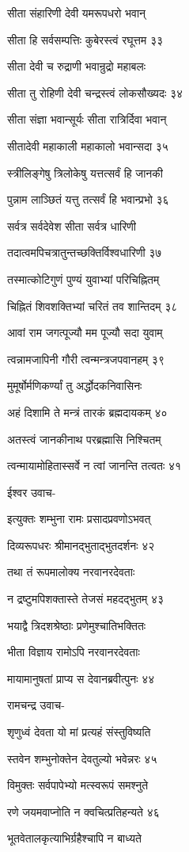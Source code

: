 सीता संहारिणी देवी यमरूपधरो भवान्

सीता हि सर्वसम्पत्तिः कुबेरस्त्वं रघूत्तम ३३

सीता देवी च रुद्राणी भवान्रुद्रो महाबलः

सीता तु रोहिणी देवी चन्द्रस्त्वं लोकसौख्यदः ३४

सीता संज्ञा भवान्सूर्यः सीता रात्रिर्दिवा भवान्

सीतादेवी महाकाली महाकालो भवान्सदा ३५

स्त्रीलिङ्गेषु त्रिलोकेषु यत्तत्सर्वं हि जानकी

पुन्नाम लाञ्छितं यत्तु तत्सर्वं हि भवान्प्रभो ३६

सर्वत्र सर्वदेवेश सीता सर्वत्र धारिणी

तदात्वमपिचत्रातुन्तच्छक्तिर्विश्वधारिणी ३७

तस्मात्कोटिगुणं पुण्यं युवाभ्यां परिचिह्नितम्

चिह्नितं शिवशक्तिभ्यां चरितं तव शान्तिदम् ३८

आवां राम जगत्पूज्यौ मम पूज्यौ सदा युवाम्

त्वन्नामजापिनी गौरी त्वन्मन्त्रजपवानहम् ३९

मुमूर्षोर्मणिकर्ण्यां तु अर्द्धोदकनिवासिनः

अहं दिशामि ते मन्त्रं तारकं ब्रह्मदायकम् ४०

अतस्त्वं जानकीनाथ परब्रह्मासि निश्चितम्

त्वन्मायामोहितास्सर्वे न त्वां जानन्ति तत्वतः ४१

ईश्वर उवाच-

इत्युक्तः शम्भुना रामः प्रसादप्रवणोऽभवत्

दिव्यरूपधरः श्रीमानद्भुताद्भुतदर्शनः ४२

तथा तं रूपमालोक्य नरवानरदेवताः

न द्रष्टुमपिशक्तास्ते तेजसं महदद्भुतम् ४३

भयाद्वै त्रिदशश्रेष्ठाः प्रणेमुश्चातिभक्तितः

भीता विज्ञाय रामोऽपि नरवानरदेवताः

मायामानुषतां प्राप्य स देवानब्रवीत्पुनः ४४

रामचन्द्र उवाच-

शृणुध्वं देवता यो मां प्रत्यहं संस्तुविष्यति

स्तवेन शम्भुनोक्तेन देवतुल्यो भवेन्नरः ४५

विमुक्तः सर्वपापेभ्यो मत्स्वरूपं समश्नुते

रणे जयमवाप्नोति न क्वचित्प्रतिहन्यते ४६

भूतवेतालकृत्याभिर्ग्रहैश्चापि न बाध्यते

